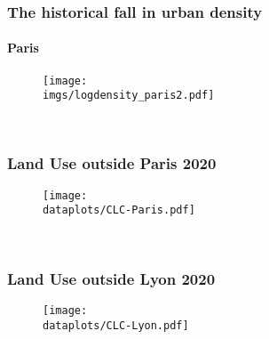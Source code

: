 \documentclass[aspectratio=169]{beamer}
\begin{document}
\beginbackup


\begin{frame}[label=Paris]
\frametitle{The historical fall in urban density}
\framesubtitle{Paris}
\begin{figure}
	\begin{center}
		\texttt{[image: \\imgs/logdensity\_paris2.pdf]}
	\end{center}
\end{figure}
\hspace{-1cm}
\hyperlink{density}{}\\
\end{frame}

\begin{frame}[label=LandUseMeasureParis]
	\frametitle{Land Use outside Paris 2020}
	\begin{figure}
		\begin{center}
			\texttt{[image: \\dataplots/CLC-Paris.pdf]}
		\end{center}
	\end{figure}
	\hspace{-1cm}
	\hyperlink{CLCmeasure}{}\\
\end{frame}

\begin{frame}[label=LandUseMeasureLyon]
	\frametitle{Land Use outside Lyon 2020}
	\begin{figure}
		\begin{center}
			\texttt{[image: \\dataplots/CLC-Lyon.pdf]}
		\end{center}
	\end{figure}
	\hspace{-1cm}
	\hyperlink{CLCmeasure}{}\\
\end{frame}
\end{document}
